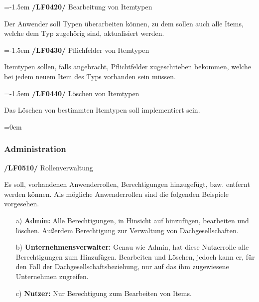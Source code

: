 \documentclass[11pt,a4paper]{report}
\begin{document}
\leftskip=-1.5em
\textbf{/LF0420/} Bearbeitung von Itemtypen
\par
\begingroup
\leftskip=1cm
\noindent Der Anwender soll Typen überarbeiten können, zu dem sollen auch alle Items, welche dem Typ zugehörig sind, aktualisiert werden.\\
\par
\endgroup

\leftskip=-1.5em
\textbf{/LF0430/} Pflichfelder von Itemtypen
\par
\begingroup
\leftskip=1cm
\noindent Itemtypen sollen, falls angebracht, Pflichtfelder zugeschrieben bekommen, welche bei jedem neuem Item des Typs vorhanden sein müssen.\\
\par
\endgroup

\leftskip=-1.5em
\textbf{/LF0440/} Löschen von Itemtypen
\par
\begingroup
\leftskip=1cm
\noindent Das Löschen von bestimmten Itemtypen soll implementiert sein.\\
\par
\endgroup

\newpage
\leftskip=0em
\subsubsection{Administration}

\textbf{/LF0510/} Rollenverwaltung
\par
\begingroup
\leftskip=1cm
\noindent Es soll, vorhandenen Anwenderrollen, Berechtigungen hinzugefügt, bzw. entfernt werden können.
Als mögliche Anwenderrollen sind die folgenden Beispiele vorgesehen.\\
\begin{enumerate}
\leftskip=3em
\item[a)] \textbf{Admin:} Alle Berechtigungen, in Hinsicht auf hinzufügen, bearbeiten und löschen.
Außerdem Berechtigung zur Verwaltung von Dachgesellschaften.\\
\item[b)] \textbf{Unternehmensverwalter:} Genau wie Admin, hat diese Nutzerrolle alle Berechtigungen zum Hinzufügen.
Bearbeiten und Löschen, jedoch kann er, für den Fall der Dachgesellschaftsbeziehung, nur auf das ihm zugewiesene Unternehmen zugreifen.\\
\item[c)] \textbf{Nutzer:} Nur Berechtigung zum Bearbeiten von Items.\\
\end{enumerate}
\par
\endgroup
\end{document}
